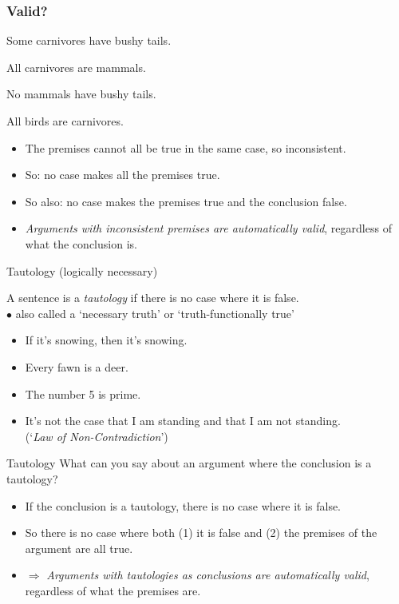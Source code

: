 \begin{frame}
  \frametitle{Valid?}
  \begin{earg}
    \item[] Some carnivores have bushy tails.
    \item[] All carnivores are mammals. 
    \item[] No mammals have bushy tails.
    \item[\therefore] All birds are carnivores. 
  \end{earg}

  \pause

  \begin{itemize}[<+->]
    \item The premises cannot all be true in the same case, so inconsistent.
    \item So: no case makes all the premises true.
    \item So also: no case makes the premises true and the conclusion false.
    \item \emph{Arguments with inconsistent premises are automatically
    valid}, regardless of what the conclusion is.
  \end{itemize}
\end{frame}

\begin{frame}{Tautology (logically necessary)}

  \begin{definition}
    A sentence is a \emph{tautology} if there is no case where
    it is false. \\ $\bullet$ also called a `necessary truth' or `truth-functionally true'
    \end{definition}
\pause
    \begin{itemize}[<+->]
      \item If it's snowing, then it's snowing.
      \item Every fawn is a deer.
      \item The number 5 is prime.
\item It's not the case that I am standing and that I am not standing. \\ (`\textit{Law of Non-Contradiction}')
    \end{itemize}
\end{frame}

\begin{frame}{Tautology}
    What can you say about an argument where the conclusion is a
    tautology? 
\pause
\begin{itemize}[<+->]
  \item If the conclusion is a tautology, there is no case where
  it is false.
  \item So there is no case where both (1) it is false and (2) the premises of the
  argument are all true.
  \item $\Rightarrow$ \emph{Arguments with tautologies as conclusions are
  automatically valid}, regardless of what the premises are.
\end{itemize}
  \end{frame}

